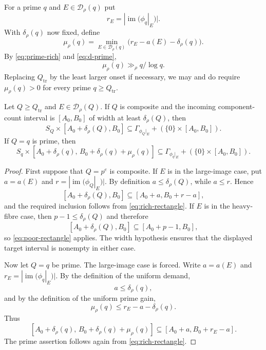 For a prime $q$ and $E\in\mathcal D_\rho(q)$ put
\[
r_E=|\operatorname{im}(\phi_q|_E)|.
\]
With $\delta_\rho(q)$ now fixed, define
\begin{equation}\label{eq:common-mint}
\mu_\rho(q)=
\min_{E\in\mathcal D_\rho(q)}
\bigl(r_E-a(E)-\delta_\rho(q)\bigr).
\end{equation}
By \eqref{eq:prime-rich} and \eqref{eq:d-prime},
\begin{equation}\label{eq:mint-prime}
\mu_\rho(q)\gg_\rho q/\log q.
\end{equation}
Replacing $Q_{\mathrm{tr}}$ by the least larger onset if necessary, we may and do require $\mu_\rho(q)>0$ for every prime $q\ge Q_{\mathrm{tr}}$.

\begin{theorem}\label{thm:uniform-profile}
Let $Q\ge Q_{\mathrm{tr}}$ and $E\in\mathcal D_\rho(Q)$.  If $Q$ is composite and the incoming component-count interval is $[A_0,B_0]$ of width at least $\delta_\rho(Q)$, then
\[
S_Q\times[A_0+\delta_\rho(Q),B_0]
\subseteq
\Gamma_{\phi_Q|_E}+(\{0\}\times[A_0,B_0]).
\]
If $Q=q$ is prime, then
\[
S_q\times
[A_0+\delta_\rho(q),\,B_0+\delta_\rho(q)+\mu_\rho(q)]
\subseteq
\Gamma_{\phi_q|_E}+(\{0\}\times[A_0,B_0]).
\]
\end{theorem}

\begin{proof}
First suppose that $Q=p^e$ is composite.  If $E$ is in the large-image case, put $a=a(E)$ and $r=|\operatorname{im}(\phi_Q|_E)|$.  By definition $a\le\delta_\rho(Q)$, while $a\le r$.  Hence
\[
[A_0+\delta_\rho(Q),B_0]
\subseteq
[A_0+a,B_0+r-a],
\]
and the required inclusion follows from \eqref{eq:rich-rectangle}.  If $E$ is in the heavy-fibre case, then $p-1\le\delta_\rho(Q)$ and therefore
\[
[A_0+\delta_\rho(Q),B_0]
\subseteq
[A_0+p-1,B_0],
\]
so \eqref{eq:poor-rectangle} applies.  The width hypothesis ensures that the displayed target interval is nonempty in either case.

Now let $Q=q$ be prime.  The large-image case is forced.  Write $a=a(E)$ and $r_E=|\operatorname{im}(\phi_q|_E)|$.  By the definition of the uniform demand,
\[
a\le\delta_\rho(q),
\]
and by the definition of the uniform prime gain,
\[
\mu_\rho(q)
\le r_E-a-\delta_\rho(q).
\]
Thus
\[
[A_0+\delta_\rho(q),\,B_0+\delta_\rho(q)+\mu_\rho(q)]
\subseteq
[A_0+a,B_0+r_E-a].
\]
The prime assertion follows again from \eqref{eq:rich-rectangle}.
\end{proof}
